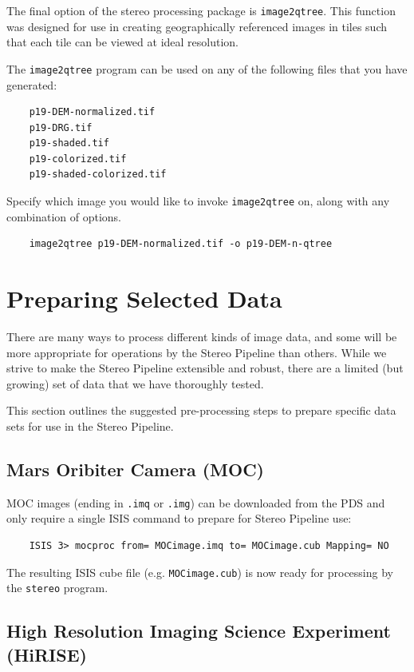 The final option of the stereo processing package is \texttt{image2qtree}.
This function was designed for use in creating geographically
referenced images in tiles such that each tile can be viewed at
ideal resolution.

The \texttt{image2qtree} program can be used on any of the following files that you 
have generated:
\begin{verbatim}
    p19-DEM-normalized.tif
    p19-DRG.tif 
    p19-shaded.tif
    p19-colorized.tif
    p19-shaded-colorized.tif
\end{verbatim}

Specify which image you would like to invoke \texttt{image2qtree} on, along
with any combination of options.

\begin{verbatim}
    image2qtree p19-DEM-normalized.tif -o p19-DEM-n-qtree
\end{verbatim}


\section{Preparing Selected Data}

There are many ways to process different kinds of image data, and
some will be more appropriate for operations by the Stereo Pipeline
than others.  While we strive to make the Stereo Pipeline extensible
and robust, there are a limited (but growing) set of data that we
have thoroughly tested.

This section outlines the suggested pre-processing steps to prepare 
specific data sets for use in the Stereo Pipeline.

\subsection{Mars Oribiter Camera (MOC)}

MOC images (ending in \texttt{.imq} or \texttt{.img}) can be downloaded from 
the PDS and only require a single ISIS command to prepare for Stereo Pipeline use:

\begin{verbatim}
    ISIS 3> mocproc from= MOCimage.imq to= MOCimage.cub Mapping= NO
\end{verbatim}

The resulting ISIS cube file (e.g. \texttt{MOCimage.cub}) is now ready
for processing by the \texttt{stereo} program.


\subsection{High Resolution Imaging Science Experiment (HiRISE)}

